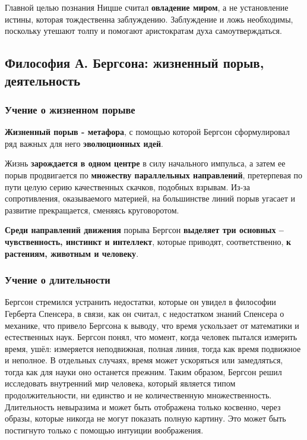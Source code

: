 \documentclass{article}
\begin{document}
\begin{flushleft}
Главной целью познания Ницше считал \textbf{овладение миром}, а не установление истины, которая тождественна заблуждению. Заблуждение и ложь необходимы, поскольку утешают толпу и помогают аристократам духа самоутверждаться.

\pagebreak
\subsection{Философия А. Бергсона: жизненный порыв, деятельность}

\subsubsection{Учение о жизненном порыве}

\textbf{Жизненный порыв - метафора}, с помощью которой Бергсон сформулировал ряд важных для него \textbf{эволюционных идей}.

Жизнь \textbf{зарождается в одном центре} в силу начального импульса, а затем ее порыв продвигается по \textbf{множеству параллельных направлений}, претерпевая по пути целую серию качественных скачков, подобных взрывам. Из-за сопротивления, оказываемого материей, на большинстве линий порыв угасает и развитие прекращается, сменяясь круговоротом. 

\textbf{Среди направлений движения} порыва Бергсон \textbf{выделяет три основных – чувственность, инстинкт и интеллект}, которые приводят, соответственно, \textbf{к растениям, животным и человеку}.

\subsubsection{Учение о длительности}

Бергсон стремился устранить недостатки, которые он увидел в философии Герберта Спенсера, в связи, как он считал, с недостатком знаний Спенсера о механике, что привело Бергсона к выводу, что время ускользает от математики и естественных наук. Бергсон понял, что момент, когда человек пытался измерить время, ушёл: измеряется неподвижная, полная линия, тогда как время подвижное и неполное. В отдельных случаях, время может ускоряться или замедляться, тогда как для науки оно останется прежним. Таким образом, Бергсон решил исследовать внутренний мир человека, который является типом продолжительности, ни единство и не количественную множественность. Длительность невыразима и может быть отображена только косвенно, через образы, которые никогда не могут показать полную картину. Это может быть постигнуто только с помощью интуиции воображения.


\end{flushleft}
\end{document}
